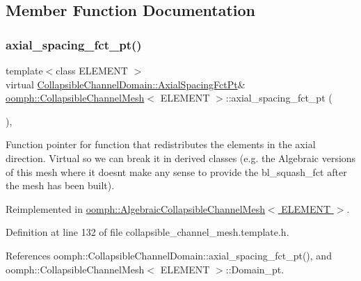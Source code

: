 \subsection{Member Function Documentation}
\mbox{\label{classoomph_1_1CollapsibleChannelMesh_ac7913dca6b8b11240caede54414f3c11}} 
\subsubsection{\texorpdfstring{axial\+\_\+spacing\+\_\+fct\+\_\+pt()}{axial\_spacing\_fct\_pt()}\hspace{0.1cm}{\footnotesize\ttfamily [1/2]}}
{\footnotesize\ttfamily template$<$class E\+L\+E\+M\+E\+NT $>$ \\
virtual \hyperlink{classoomph_1_1CollapsibleChannelDomain_a317472dab112beac771ecf6442a465f5}{Collapsible\+Channel\+Domain\+::\+Axial\+Spacing\+Fct\+Pt}\& \hyperlink{classoomph_1_1CollapsibleChannelMesh}{oomph\+::\+Collapsible\+Channel\+Mesh}$<$ E\+L\+E\+M\+E\+NT $>$\+::axial\+\_\+spacing\+\_\+fct\+\_\+pt (\begin{DoxyParamCaption}{ }\end{DoxyParamCaption})\hspace{0.3cm}{\ttfamily [inline]}, {\ttfamily [virtual]}}



Function pointer for function that redistributes the elements in the axial direction. Virtual so we can break it in derived classes (e.\+g. the Algebraic versions of this mesh where it doesn\textquotesingle{}t make any sense to provide the bl\+\_\+squash\+\_\+fct after the mesh has been built). 



Reimplemented in \hyperlink{classoomph_1_1AlgebraicCollapsibleChannelMesh_afa53bd526ff0903526afbdf5e6f4f532}{oomph\+::\+Algebraic\+Collapsible\+Channel\+Mesh$<$ E\+L\+E\+M\+E\+N\+T $>$}.



Definition at line 132 of file collapsible\+\_\+channel\+\_\+mesh.\+template.\+h.



References oomph\+::\+Collapsible\+Channel\+Domain\+::axial\+\_\+spacing\+\_\+fct\+\_\+pt(), and oomph\+::\+Collapsible\+Channel\+Mesh$<$ E\+L\+E\+M\+E\+N\+T $>$\+::\+Domain\+\_\+pt.

